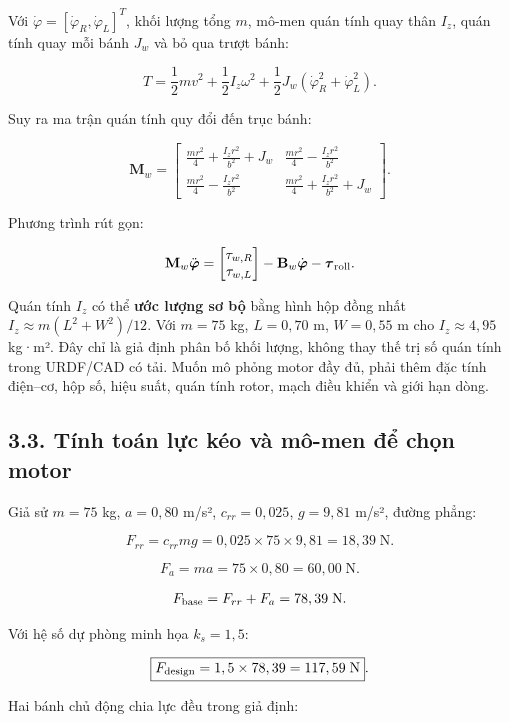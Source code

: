 \documentclass[
  12pt,
  a4paper,
]{article}
\begin{document}
Với \(\dot{\varphi}=[\dot{\varphi}_R,\dot{\varphi}_L]^T\), khối lượng
tổng \(m\), mô-men quán tính quay thân \(I_z\), quán tính quay mỗi bánh
\(J_w\) và bỏ qua trượt bánh:

\[
T=\frac12 mv^2+\frac12 I_z\omega^2+
\frac12J_w(\dot{\varphi}_R^2+\dot{\varphi}_L^2).
\]

Suy ra ma trận quán tính quy đổi đến trục bánh:

\[
\mathbf M_w =
\begin{bmatrix}
\frac{mr^2}{4}+\frac{I_zr^2}{b^2}+J_w &\frac{mr^2}{4}-\frac{I_zr^2}{b^2}\\
\frac{mr^2}{4}-\frac{I_zr^2}{b^2}&\frac{mr^2}{4}+\frac{I_zr^2}{b^2}+J_w
\end{bmatrix}.
\]

Phương trình rút gọn:

\[
\mathbf M_w\ddot{\boldsymbol\varphi}
=\begin{bmatrix}\tau_{w,R}\\\tau_{w,L}\end{bmatrix}
-\mathbf B_w\dot{\boldsymbol\varphi}
-\boldsymbol\tau_{\rm roll}.
\]

Quán tính \(I_z\) có thể \textbf{ước lượng sơ bộ} bằng hình hộp đồng
nhất \(I_z\approx m(L^2+W^2)/12\). Với \(m=75\) kg, \(L=0,70\) m,
\(W=0,55\) m cho \(I_z\approx4,95\) kg·m². Đây chỉ là giả định phân bố
khối lượng, không thay thế trị số quán tính trong URDF/CAD có tải. Muốn
mô phỏng motor đầy đủ, phải thêm đặc tính điện--cơ, hộp số, hiệu suất,
quán tính rotor, mạch điều khiển và giới hạn dòng.

\subsection{3.3. Tính toán lực kéo và mô-men để chọn
motor}\label{tuxednh-touxe1n-lux1ef1c-kuxe9o-vuxe0-muxf4-men-ux111ux1ec3-chux1ecdn-motor}

Giả sử \(m=75\) kg, \(a=0,80\) m/s², \(c_{rr}=0,025\), \(g=9,81\) m/s²,
đường phẳng:

\[
F_{rr}=c_{rr}mg=0,025\times75\times9,81=18,39\;\text{N}.
\]

\[
F_a=ma=75\times0,80=60,00\;\text{N}.
\]

\[
F_{\rm base}=F_{rr}+F_a=78,39\;\text{N}.
\]

Với hệ số dự phòng minh họa \(k_s=1,5\):

\[
\boxed{F_{\rm design}=1,5\times78,39=117,59\;\text{N}}.
\]

Hai bánh chủ động chia lực đều trong giả định:
\end{document}
